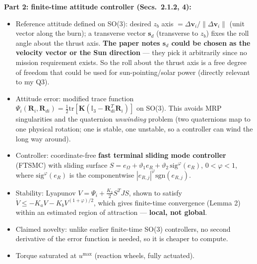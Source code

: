 \documentclass[11pt]{article}
\begin{document}
\textbf{Part 2: finite-time attitude controller (Secs.\ 2.1.2, 4):}
\begin{itemize}[noitemsep]
    \item Reference attitude defined on SO(3): desired $z_b$ axis $= \Delta \mathbf{v}_i / \|\Delta \mathbf{v}_i\|$ (unit vector along the burn); a transverse vector $\mathbf{s}_d$ (transverse to $z_b$) fixes the roll angle about the thrust axis. \textbf{The paper notes $\mathbf{s}_d$ could be chosen as the velocity vector or the Sun direction} --- they pick it arbitrarily since no mission requirement exists. So the roll about the thrust axis is a free degree of freedom that could be used for sun-pointing/solar power (directly relevant to my Q3).
    \item Attitude error: modified trace function $\Psi_i(\mathbf{R}_i, \mathbf{R}_{di}) = \frac{1}{2}\mathrm{tr}[\mathbf{K}(\mathbb{I}_3 - \mathbf{R}_{di}^T \mathbf{R}_i)]$ on SO(3). This avoids MRP singularities and the quaternion \textit{unwinding} problem (two quaternions map to one physical rotation; one is stable, one unstable, so a controller can wind the long way around).
    \item Controller: coordinate-free \textbf{fast terminal sliding mode controller} (FTSMC) with sliding surface
    $S = e_{\Omega} + \vartheta_1 e_R + \vartheta_2\, \mathrm{sig}^{\varphi}(e_R)$, $0 < \varphi < 1$, where $\mathrm{sig}^{\varphi}(e_R)$ is the componentwise $|e_{R,j}|^{\varphi}\mathrm{sgn}(e_{R,j})$.
    \item Stability: Lyapunov $V = \Psi_i + \frac{K_3}{2} S^T J S$, shown to satisfy $\dot{V} \le -K_a V - K_b V^{(1+\varphi)/2}$, which gives finite-time convergence (Lemma 2) within an estimated region of attraction --- \textbf{local, not global}.
    \item Claimed novelty: unlike earlier finite-time SO(3) controllers, no second derivative of the error function is needed, so it is cheaper to compute.
    \item Torque saturated at $u^{\max}$ (reaction wheels, fully actuated).
\end{itemize}
\end{document}
